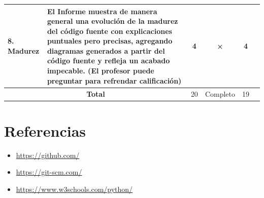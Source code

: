 \documentclass{article}
\begin{document}
\begin{table}[H]
\begin{tabular}{|p{2cm}|p{6cm}|c|c|c|c|}
		8. Madurez                                              & El Informe muestra de manera general una evolución de la madurez del código fuente con explicaciones puntuales pero precisas, agregando diagramas generados a partir del código fuente y refleja un acabado impecable. (El profesor puede preguntar para refrendar calificación) & 4                  & ×                   & 4                 & \\ \hline
		\multicolumn{2}{|c|}{\textbf{Total}}                    & 20                                                                                                                                                                                                                                                                               & Completo           & 19                  &                     \\ \hline
	\end{tabular}
\end{table}

\section{Referencias}
\begin{itemize}
	\item \url{https://github.com/}
	\item \url{https://git-scm.com/}
	\item \url{https://www.w3schools.com/python/}
\end{itemize}

\pagebreak



\end{document}
